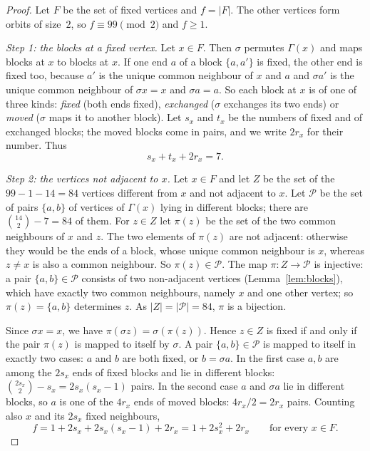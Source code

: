\documentclass[11pt,a4paper]{article}
\theoremstyle{definition}
\theoremstyle{remark}
\newcommand{\sg}{\sigma}
\newcommand{\Nb}{\Gamma}
\begin{document}
\begin{proof}
Let $F$ be the set of fixed vertices and $f=|F|$. The other vertices form orbits of size~$2$, so $f\equiv99\pmod2$
and $f\ge1$.

\medskip\noindent\emph{Step 1: the blocks at a fixed vertex.}
Let $x\in F$. Then $\sg$ permutes $\Nb(x)$ and maps blocks at $x$ to blocks at $x$. If one end $a$ of a block
$\{a,a'\}$ is fixed, the other end is fixed too, because $a'$ is the unique common neighbour of $x$ and $a$ and
$\sg a'$ is the unique common neighbour of $\sg x=x$ and $\sg a=a$. So each block at $x$ is of one of three kinds:
\emph{fixed} (both ends fixed), \emph{exchanged} ($\sg$ exchanges its two ends) or \emph{moved} ($\sg$ maps it to
another block). Let $s_x$ and $t_x$ be the numbers of fixed and of exchanged blocks; the moved blocks come in pairs,
and we write $2r_x$ for their number. Thus
\begin{equation}\label{eq:str}
s_x+t_x+2r_x=7 .
\end{equation}

\medskip\noindent\emph{Step 2: the vertices not adjacent to $x$.}
Let $x\in F$ and let $Z$ be the set of the $99-1-14=84$ vertices different from $x$ and not adjacent to $x$. Let
$\mathcal P$ be the set of pairs $\{a,b\}$ of vertices of $\Nb(x)$ lying in different blocks; there are
$\binom{14}{2}-7=84$ of them. For $z\in Z$ let $\pi(z)$ be the set of the two common neighbours of $x$ and $z$. The
two elements of $\pi(z)$ are not adjacent: otherwise they would be the ends of a block, whose unique common
neighbour is $x$, whereas $z\ne x$ is also a common neighbour. So $\pi(z)\in\mathcal P$. The map
$\pi:Z\to\mathcal P$ is injective: a pair $\{a,b\}\in\mathcal P$ consists of two non-adjacent vertices
(Lemma~\ref{lem:blocks}), which have exactly two common neighbours, namely $x$ and one other vertex; so
$\pi(z)=\{a,b\}$ determines $z$. As $|Z|=|\mathcal P|=84$, $\pi$ is a bijection.

Since $\sg x=x$, we have $\pi(\sg z)=\sg(\pi(z))$. Hence $z\in Z$ is fixed if and only if the pair $\pi(z)$ is
mapped to itself by $\sg$. A pair $\{a,b\}\in\mathcal P$ is mapped to itself in exactly two cases: $a$ and $b$ are
both fixed, or $b=\sg a$. In the first case $a,b$ are among the $2s_x$ ends of fixed blocks and lie in different
blocks: $\binom{2s_x}{2}-s_x=2s_x(s_x-1)$ pairs. In the second case $a$ and $\sg a$ lie in different blocks, so $a$
is one of the $4r_x$ ends of moved blocks: $4r_x/2=2r_x$ pairs. Counting also $x$ and its $2s_x$ fixed neighbours,
\begin{equation}\label{eq:f}
f=1+2s_x+2s_x(s_x-1)+2r_x=1+2s_x^2+2r_x\qquad\text{for every }x\in F .
\end{equation}


\end{proof}
\end{document}
